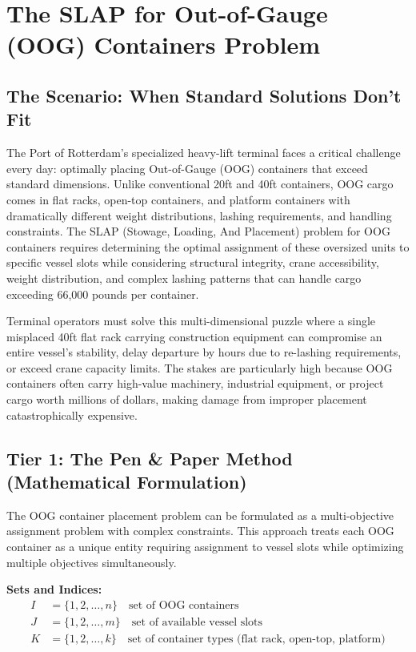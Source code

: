 \documentclass{article}
\begin{document}
\section{The SLAP for Out-of-Gauge (OOG) Containers Problem}

\subsection{The Scenario: When Standard Solutions Don't Fit}

The Port of Rotterdam's specialized heavy-lift terminal faces a critical challenge every day: optimally placing Out-of-Gauge (OOG) containers that exceed standard dimensions. Unlike conventional 20ft and 40ft containers, OOG cargo comes in flat racks, open-top containers, and platform containers with dramatically different weight distributions, lashing requirements, and handling constraints. The SLAP (Stowage, Loading, And Placement) problem for OOG containers requires determining the optimal assignment of these oversized units to specific vessel slots while considering structural integrity, crane accessibility, weight distribution, and complex lashing patterns that can handle cargo exceeding 66,000 pounds per container.

Terminal operators must solve this multi-dimensional puzzle where a single misplaced 40ft flat rack carrying construction equipment can compromise an entire vessel's stability, delay departure by hours due to re-lashing requirements, or exceed crane capacity limits. The stakes are particularly high because OOG containers often carry high-value machinery, industrial equipment, or project cargo worth millions of dollars, making damage from improper placement catastrophically expensive.

\subsection{Tier 1: The Pen \& Paper Method (Mathematical Formulation)}

The OOG container placement problem can be formulated as a multi-objective assignment problem with complex constraints. This approach treats each OOG container as a unique entity requiring assignment to vessel slots while optimizing multiple objectives simultaneously.

\textbf{Sets and Indices:}
\begin{align}
I &= \{1, 2, \ldots, n\} \quad \text{set of OOG containers} \\
J &= \{1, 2, \ldots, m\} \quad \text{set of available vessel slots} \\
K &= \{1, 2, \ldots, k\} \quad \text{set of container types (flat rack, open-top, platform)}
\end{align}
\end{document}
